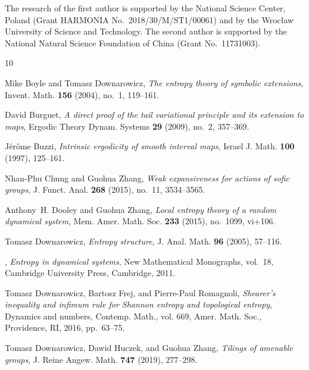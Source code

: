 \documentclass[12pt]{amsart}
\theoremstyle{definition}
\numberwithin{equation}{section}
\begin{document}
The research of the first author is supported by the National Science Center, Poland (Grant
HARMONIA No.\ 2018/30/M/ST1/00061) and by the Wroc\l aw University of Science and
Technology.
The second author is supported by the National Natural Science Foundation of China (Grant No.\ 11731003).



%


\begin{thebibliography}{10}

Mike Boyle and Tomasz Downarowicz, \emph{The entropy theory of symbolic
	extensions}, Invent. Math. \textbf{156} (2004), no.~1, 119--161. 

David Burguet, \emph{A direct proof of the tail variational principle and its
	extension to maps}, Ergodic Theory Dynam. Systems \textbf{29} (2009), no.~2,
357--369. 

J{\'e}r{\^o}me Buzzi, \emph{Intrinsic ergodicity of smooth interval maps},
Israel J. Math. \textbf{100} (1997), 125--161. 

Nhan-Phu Chung and Guohua Zhang, \emph{Weak expansiveness for actions of sofic
	groups}, J. Funct. Anal. \textbf{268} (2015), no.~11, 3534--3565.

Anthony~H. Dooley and Guohua Zhang, \emph{Local entropy theory of a random
	dynamical system}, Mem. Amer. Math. Soc. \textbf{233} (2015), no.~1099,
vi+106. 

Tomasz Downarowicz, \emph{Entropy structure}, J. Anal. Math. \textbf{96}
(2005), 57--116. 

\bysame, \emph{Entropy in dynamical systems}, New Mathematical Monographs,
vol.~18, Cambridge University Press, Cambridge, 2011. 

Tomasz Downarowicz, Bartosz Frej, and Pierre-Paul Romagnoli, \emph{Shearer's
	inequality and infimum rule for {S}hannon entropy and topological entropy},
Dynamics and numbers, Contemp. Math., vol. 669, Amer. Math. Soc., Providence,
RI, 2016, pp.~63--75. 

Tomasz Downarowicz, Dawid Huczek, and Guohua Zhang, \emph{Tilings of amenable
	groups}, J. Reine Angew. Math. \textbf{747} (2019), 277--298. 


\end{thebibliography}
\end{document}
